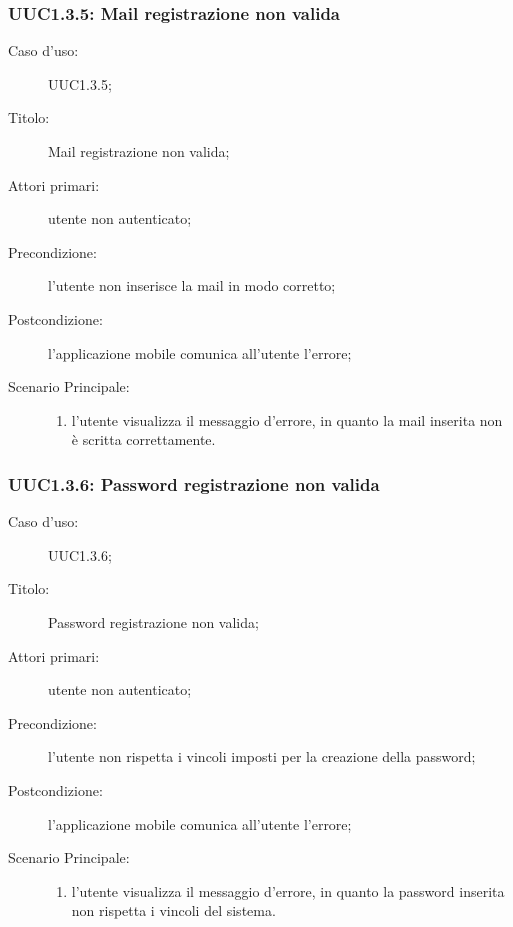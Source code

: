 \documentclass[../../../analisi-dei-requisiti.tex]{subfiles}
\begin{document}
\subsubsection{UUC1.3.5: Mail registrazione non valida}%
\label{subs:UUC1.3.5}
\begin{description}
  \item[Caso d'uso:] UUC1.3.5;
  \item[Titolo:] Mail registrazione non valida;
  \item[Attori primari:] utente non autenticato;
  \item[Precondizione:] l'utente non inserisce la mail in modo corretto;
  \item[Postcondizione:] l'applicazione mobile comunica all'utente l'errore;
  \item[Scenario Principale:]
        \begin{enumerate}
          \item l'utente visualizza il messaggio d'errore, in quanto la mail inserita non è scritta correttamente.
        \end{enumerate}
\end{description}

\subsubsection{UUC1.3.6: Password registrazione non valida}%
\label{subs:UUC1.3.6}
\begin{description}
  \item[Caso d'uso:] UUC1.3.6;
  \item[Titolo:] Password registrazione non valida;
  \item[Attori primari:] utente non autenticato;
  \item[Precondizione:] l'utente non rispetta i vincoli imposti per la creazione della password;
  \item[Postcondizione:] l'applicazione mobile comunica all'utente l'errore;
  \item[Scenario Principale:]
        \begin{enumerate}
          \item l'utente visualizza il messaggio d'errore, in quanto la password inserita non rispetta i vincoli del sistema.
        \end{enumerate}
\end{description}
\end{document}
